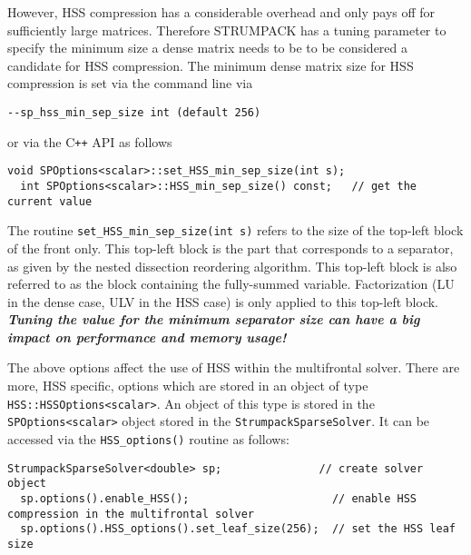 \documentclass{article}
\begin{document}
However, HSS compression has a considerable overhead and only pays off
for sufficiently large matrices. Therefore STRUMPACK has a tuning
parameter to specify the minimum size a dense matrix needs to be to be
considered a candidate for HSS compression. The minimum dense matrix
size for HSS compression is set via the command line via
\begin{lstlisting}[style=Bash]
  --sp_hss_min_sep_size int (default 256)
\end{lstlisting}
or via the C\texttt{++} API as follows
\begin{lstlisting}[style=C]
  void SPOptions<scalar>::set_HSS_min_sep_size(int s);
  int SPOptions<scalar>::HSS_min_sep_size() const;   // get the current value
\end{lstlisting}
The routine %
\lstinline[style=C]!set_HSS_min_sep_size(int s)! refers to the size of
the top-left block of the front only. This top-left block is the part
that corresponds to a separator, as given by the nested dissection
reordering algorithm. This top-left block is also referred to as the
block containing the fully-summed variable. Factorization (LU in the
dense case, ULV in the HSS case) is only applied to this top-left
block.
\emph{\textbf{Tuning the value for the minimum separator size can have
    a big impact on performance and memory usage!}}

The above options affect the use of HSS within the multifrontal
solver. There are more, HSS specific, options which are stored in an
object of type \lstinline[style=C]!HSS::HSSOptions<scalar>!. An object
of this type is stored in the \lstinline[style=C]!SPOptions<scalar>!
object stored in the \lstinline[style=C]!StrumpackSparseSolver!. It
can be accessed via the \lstinline[style=C]!HSS_options()! routine as
follows:
\begin{lstlisting}[style=C]
  StrumpackSparseSolver<double> sp;               // create solver object
  sp.options().enable_HSS();                      // enable HSS compression in the multifrontal solver
  sp.options().HSS_options().set_leaf_size(256);  // set the HSS leaf size
\end{lstlisting}
\end{document}
